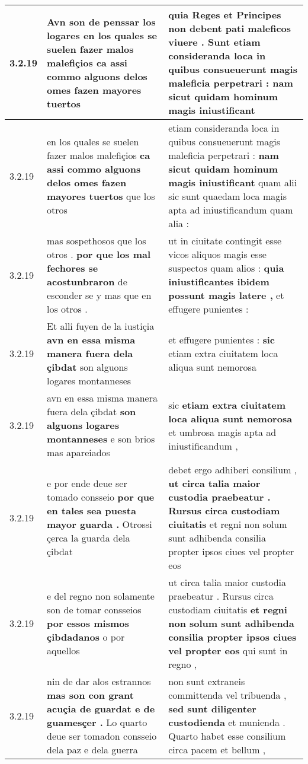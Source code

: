 \begin{tabular}{|p{1cm}|p{6.5cm}|p{6.5cm}|}
3.2.19 & Avn son de penssar los logares \textbf{ en los quales se suelen fazer malos malefiçios } ca assi commo alguons delos omes fazen mayores tuertos & quia Reges et Principes non debent pati maleficos viuere . Sunt \textbf{ etiam consideranda loca in quibus consueuerunt magis maleficia perpetrari : } nam sicut quidam hominum magis iniustificant \\\hline
3.2.19 & en los quales se suelen fazer malos malefiçios \textbf{ ca assi commo alguons delos omes fazen mayores tuertos } que los otros & etiam consideranda loca in quibus consueuerunt magis maleficia perpetrari : \textbf{ nam sicut quidam hominum magis iniustificant } quam alii sic sunt quaedam loca magis apta ad iniustificandum quam alia : \\\hline
3.2.19 & mas sospethosos que los otros . \textbf{ por que los mal fechores se acostunbraron } de esconder se y mas que en los otros . & ut in ciuitate contingit esse vicos aliquos magis esse suspectos quam alios : \textbf{ quia iniustificantes ibidem possunt magis latere , } et effugere punientes : \\\hline
3.2.19 & Et alli fuyen de la iustiçia \textbf{ avn en essa misma manera fuera dela çibdat } son alguons logares montanneses & et effugere punientes : \textbf{ sic } etiam extra ciuitatem loca aliqua sunt nemorosa \\\hline
3.2.19 & avn en essa misma manera fuera dela çibdat \textbf{ son alguons logares montanneses } e son brios mas apareiados & sic \textbf{ etiam extra ciuitatem loca aliqua sunt nemorosa } et umbrosa magis apta ad iniustificandum , \\\hline
3.2.19 & e por ende deue ser tomado consseio \textbf{ por que en tales sea puesta mayor guarda . } Otrossi çerca la guarda dela çibdat & debet ergo adhiberi consilium , \textbf{ ut circa talia maior custodia praebeatur . Rursus circa custodiam ciuitatis } et regni non solum sunt adhibenda consilia propter ipsos ciues vel propter eos \\\hline
3.2.19 & e del regno non solamente son de tomar consseios \textbf{ por essos mismos çibdadanos } o por aquellos & ut circa talia maior custodia praebeatur . Rursus circa custodiam ciuitatis \textbf{ et regni non solum sunt adhibenda consilia propter ipsos ciues vel propter eos } qui sunt in regno , \\\hline
3.2.19 & nin de dar alos estrannos \textbf{ mas son con grant acuçia de guardat e de guamesçer . } Lo quarto deue ser tomadon consseio dela paz e dela guerra & non sunt extraneis committenda vel tribuenda , \textbf{ sed sunt diligenter custodienda } et munienda . Quarto habet esse consilium circa pacem et bellum , \\\hline

\end{tabular}
